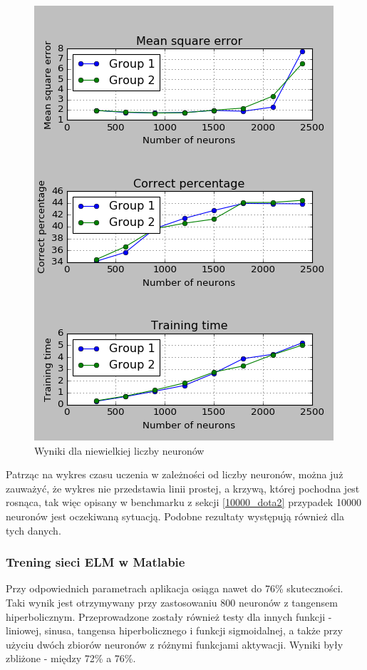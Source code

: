 \documentclass{article}
\begin{document}
\begin{figure}[H]
\centering
\includegraphics[width=\textwidth]{wyniki_forest_python.png}
\caption{Wyniki dla niewielkiej liczby neuronów}
\label{forest_python}
\end{figure}
Patrząc na wykres czasu uczenia w zależności od liczby neuronów, można już zauważyć, że wykres nie przedstawia linii prostej, a krzywą, której pochodna jest rosnąca, tak więc opisany w benchmarku z sekcji \ref{10000_dota2} przypadek 10000 neuronów jest oczekiwaną sytuacją. Podobne rezultaty występują również dla tych danych.
\subsubsection{Trening sieci ELM w Matlabie}
Przy odpowiednich parametrach aplikacja osiąga nawet do 76\% skuteczności. 
Taki wynik jest otrzymywany przy zastosowaniu 800 neuronów z tangensem hiperbolicznym.
Przeprowadzone zostały również testy dla innych funkcji - liniowej, sinusa, tangensa hiperbolicznego i funkcji sigmoidalnej, a także przy użyciu dwóch zbiorów neuronów z różnymi funkcjami aktywacji.
Wyniki były zbliżone - między 72\% a 76\%.
\end{document}
